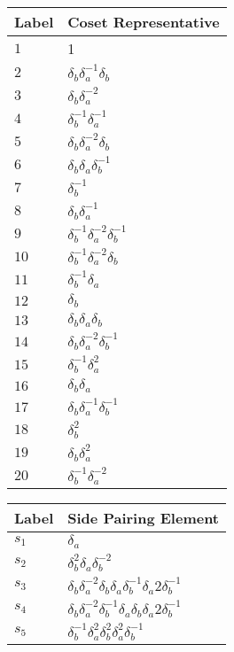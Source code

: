 \documentclass{article}
\begin{document}

\begin{center}
\begin{tabular}{ll}
\toprule
Label & Coset Representative\\
\midrule
$1$ & 1 \\
$2$ & $\delta_b^{}\delta_a^{-1}\delta_b^{}$ \\
$3$ & $\delta_b^{}\delta_a^{-2}$ \\
$4$ & $\delta_b^{-1}\delta_a^{-1}$ \\
$5$ & $\delta_b^{}\delta_a^{-2}\delta_b^{}$ \\
$6$ & $\delta_b^{}\delta_a^{}\delta_b^{-1}$ \\
$7$ & $\delta_b^{-1}$ \\
$8$ & $\delta_b^{}\delta_a^{-1}$ \\
$9$ & $\delta_b^{-1}\delta_a^{-2}\delta_b^{-1}$ \\
$10$ & $\delta_b^{-1}\delta_a^{-2}\delta_b^{}$ \\
$11$ & $\delta_b^{-1}\delta_a^{}$ \\
$12$ & $\delta_b^{}$ \\
$13$ & $\delta_b^{}\delta_a^{}\delta_b^{}$ \\
$14$ & $\delta_b^{}\delta_a^{-2}\delta_b^{-1}$ \\
$15$ & $\delta_b^{-1}\delta_a^{2}$ \\
$16$ & $\delta_b^{}\delta_a^{}$ \\
$17$ & $\delta_b^{}\delta_a^{-1}\delta_b^{-1}$ \\
$18$ & $\delta_b^{2}$ \\
$19$ & $\delta_b^{}\delta_a^{2}$ \\
$20$ & $\delta_b^{-1}\delta_a^{-2}$ \\
\bottomrule
\end{tabular}
\hfill
\begin{tabular}{ll}
\toprule
Label & Side Pairing Element\\
\midrule
$s_{1}$ & $\delta_a^{}$ \\
$s_{2}$ & $\delta_b^{2}\delta_a^{}\delta_b^{-2}$ \\
$s_{3}$ & $\delta_b^{}\delta_a^{-2}\delta_b^{}\delta_a^{}\delta_b^{-1}\delta_a^\
{2}\delta_b^{-1}$ \\
$s_{4}$ & $\delta_b^{}\delta_a^{-2}\delta_b^{-1}\delta_a^{}\delta_b^{}\delta_a^\
{2}\delta_b^{-1}$ \\
$s_{5}$ & $\delta_b^{-1}\delta_a^{2}\delta_b^{2}\delta_a^{2}\delta_b^{-1}$ \\

\end{tabular}
\end{center}
\end{document}
